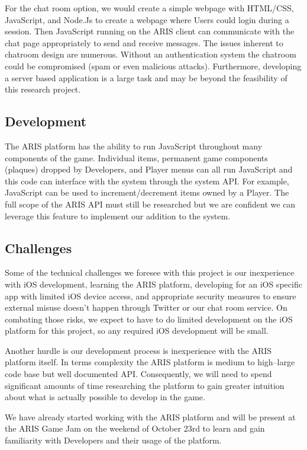 \documentclass{sigchi}
\begin{document}
For the chat room option, we would create a simple webpage with HTML/CSS, JavaScript, and Node.Js to create a webpage where Users could login during a session. Then JavaScript running on the ARIS client can communicate with the chat page appropriately to send and receive messages. The issues inherent to chatroom design are numerous. Without an authentication system the chatroom could be compromised (spam or even malicious attacks). Furthermore, developing a server based application is a large task and may be beyond the feasibility of this research project.

\subsection{Development}
The ARIS platform has the ability to run JavaScript throughout many components of the game. Individual items, permanent game components (plaques) dropped by Developers, and Player menus can all run JavaScript and this code can interface with the system through the system API. For example, JavaScript can be used to increment/decrement items owned by a Player. The full scope of the ARIS API must still be researched but we are confident we can leverage this feature to implement our addition to the system.

\subsection{Challenges}
Some of the technical challenges we foresee with this project is our inexperience with iOS development, learning the ARIS platform, developing for an iOS specific app with limited iOS device access, and appropriate security measures to ensure external misuse doesn't happen through Twitter or our chat room service. On combating those risks, we expect to have to do limited development on the iOS platform for this project, so any required iOS development will be small. 

Another hurdle is our development process is inexperience with the ARIS platform itself. In terms complexity the ARIS platform is medium to high--large code base but well documented API. Consequently, we will need to spend significant amounts of time researching the platform to gain greater intuition about what is actually possible to develop in the game.

We have already started working with the ARIS platform and will be present at the ARIS Game Jam on the weekend of October 23rd to learn and gain familiarity with Developers and their usage of the platform.
\end{document}
